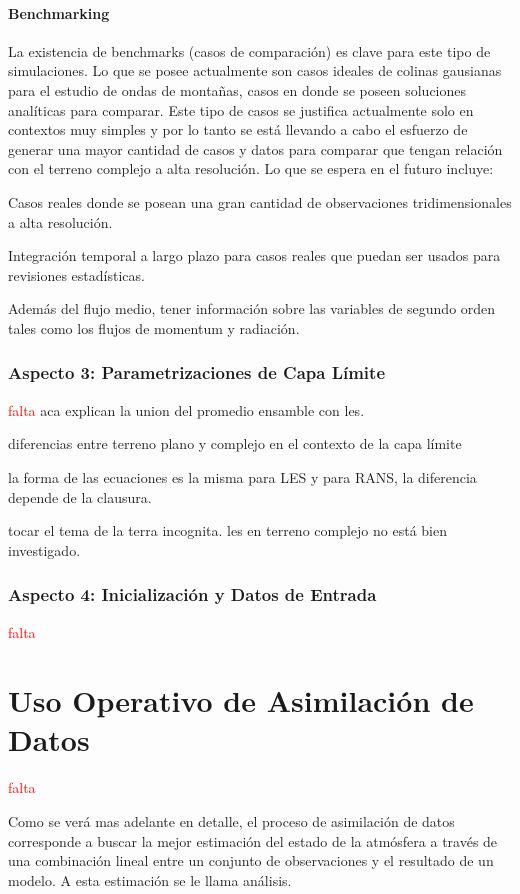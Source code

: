 \paragraph{Benchmarking} La existencia de benchmarks (casos de comparación) es clave para este tipo de simulaciones. Lo que se posee actualmente son casos ideales de colinas gausianas para el estudio de ondas de montañas, casos en donde se poseen soluciones analíticas para comparar. Este tipo de casos se justifica actualmente solo en contextos muy simples y por lo tanto se está llevando a cabo el esfuerzo de generar una mayor cantidad de casos y datos para comparar que tengan relación con el terreno complejo a alta resolución. Lo que se espera en el futuro incluye:
\begin{itemize*}
	\item Casos reales donde se posean una gran cantidad de observaciones tridimensionales a alta resolución.
	\item Integración temporal a largo plazo para casos reales que puedan ser usados para revisiones estadísticas.
	\item Además del flujo medio, tener información sobre las variables de segundo orden tales como los flujos de momentum y radiación.
\end{itemize*} 
\subsubsection{Aspecto 3: Parametrizaciones de Capa Límite}
\textcolor{red}{falta}
aca explican la union del promedio ensamble con les.

diferencias entre terreno plano y complejo en el contexto de la capa límite

la forma de las ecuaciones es la misma para LES y para RANS, la diferencia depende de la clausura.

tocar el tema de la terra incognita. les en terreno complejo no está bien investigado.

\subsubsection{Aspecto 4: Inicialización y Datos de Entrada}
\textcolor{red}{falta}

\section{Uso Operativo de Asimilación de Datos}
\textcolor{red}{falta}

Como se verá mas adelante en detalle, el proceso de asimilación de datos corresponde a buscar la mejor  estimación del estado de la atmósfera a través de una combinación lineal entre un conjunto de observaciones y el resultado de un modelo. A esta estimación se le llama análisis.

